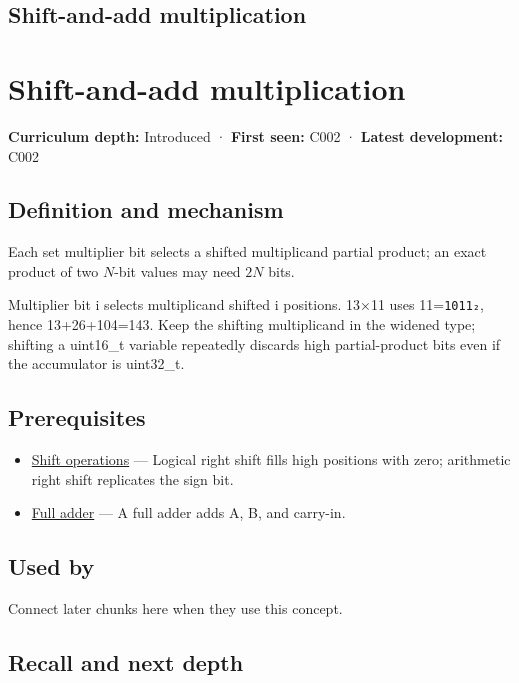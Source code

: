 \hypertarget{appendix-a65290d66ed9}{}
\section*{Shift-and-add multiplication}
\chapter{Shift-and-add multiplication}\label{appendix-a65290d66ed9-shift-and-add-multiplication}

\textbf{Curriculum depth:} Introduced · \textbf{First seen:} C002 · \textbf{Latest development:} C002

\section{Definition and mechanism}\label{appendix-a65290d66ed9-definition-and-mechanism}

Each set multiplier bit selects a shifted multiplicand partial product; an exact product of two \(N\)-bit values may need \(2N\) bits.

Multiplier bit i selects multiplicand shifted i positions. 13×11 uses 11=\texttt{1011₂}, hence 13+26+104=143. Keep the shifting multiplicand in the widened type; shifting a uint16\_t variable repeatedly discards high partial-product bits even if the accumulator is uint32\_t.

\section{Prerequisites}\label{appendix-a65290d66ed9-prerequisites}

\begin{itemize}
\tightlist
\item
  \hyperref[appendix-73425b25118e]{Shift operations} --- Logical right shift fills high positions with zero; arithmetic right shift replicates the sign bit.
\item
  \hyperref[appendix-d1a5b1e520c2]{Full adder} --- A full adder adds A, B, and carry-in.
\end{itemize}

\section{Used by}\label{appendix-a65290d66ed9-used-by}

Connect later chunks here when they use this concept.

\section{Recall and next depth}\label{appendix-a65290d66ed9-recall-and-next-depth}

